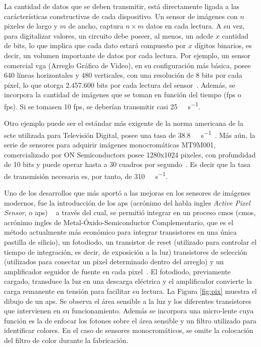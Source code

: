 La cantidad de datos que se deben transmitir, está directamente ligada a las carácterísticas constructivas de cada dispositivo. Un sensor de imágenes con $n$ pixeles de largo y $m$ de ancho, captura $n\times m$ datos en cada lectura. A su vez, para digitalizar valores, un circuito debe poseer, al menos, un \acrfull{adc}de $x$ cantidad de bits, lo que implica que cada dato estará compuesto por $x$ dígitos binarios, es decir, un volumen importante de datos por cada lectura. Por ejemplo, un sensor comercial \acrshort{vga} (Arreglo Gráfico de Video), en su configuración más básica, posee 640 líneas horizontales y 480 verticales, con una resolución de 8 bits por cada pixel, lo que otorga 2.457.600 bits por cada lectura del sensor~\cite{ONSemiconductor2014}. Además, se incorpora la cantidad de imágenes que se toman en función del tiempo (\acrlong{fps} o \acrshort{fps}). Si se tomasen 10 \acrshort{fps}, se deberían transmitir casi \SI{25}{\mega\bit\per\second}.

Otro ejemplo puede ser el estándar más exigente de la norma americana de la \acrfull{scte} utilizada para Televisión Digital, posee una tasa de \SI{38.8}{\mega\bit\per\second}~\cite{SocietyofCableTelecommuniocationsEngineers2006}. Más aún, la serie de sensores para adquirir imágenes monocromáticas MT9M001, comercializado por ON Semiconductors posee 1280x1024 pixeles, con profundidad de 10 bits y puede operar hasta a 30 cuadros por segundo~\cite{MicronTechnology2004}. Es decir que la tasa de transmisión necesaria es, por tanto, de \SI{310}{\mega\bit\per\second}.

Uno de los desarrollos que más aportó a las mejoras en los sensores de imágenes modernos, fue la introducción de los \acrshort{aps} (acrónimo del habla ingles {\it Active Pixel Sensor}, o \acrlong{aps}) ~\cite{Mendis1994} a través del cual, se permitió integrar en un proceso \acrlong{cmos} (\acrshort{cmos}, acrónimo ingles de Metal-Óxido-Semiconductor Complementario, que es el método actualmente más económico para integrar transistores en una única pastilla de silicio), un fotodiodo, un transistor de reset (utilizado para controlar el tiempo de integración, es decir, de exposición a la luz) transistores de selección (utilizados para conectar un pixel determinado dentro del arreglo) y un amplificador seguidor de fuente en cada pixel~\cite{Turchetta2019}. El fotodiodo, previamente cargado, transduce la luz en una descarga eléctrica y el amplificador convierte la carga remanente en tensión para facilitar su lectura. La Figura \ref{fig:pix} muestra el dibujo de un \acrshort{aps}. Se observa el área sensible a la luz y los diferentes transistores que intervienen en su funcionamiento. Además se incorpora una micro-lente cuya función es la de enfocar los fotones sobre el área sensible y un filtro utilizado para identificar colores. En el caso de sensores monocromáticos, se omite la colocación del filtro de color durante la fabricación.%

